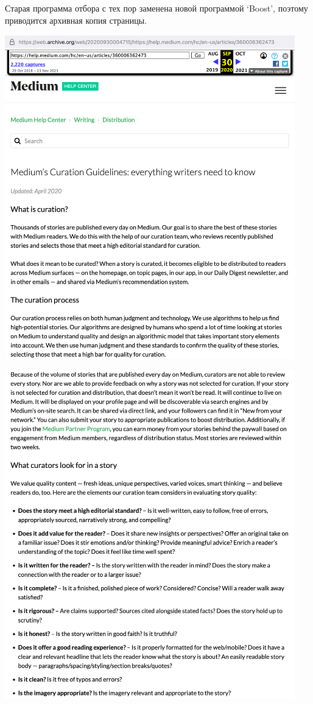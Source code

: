 
Старая программа отбора с тех пор заменена новой программой `Boost',
поэтому приводится архивная копия страницы.

\begin{center}
    \includegraphics[width=34em]{medium-help-curation-p1}
\end{center}
\WillContinue
\pagebreak

\Continuing
\begin{center}
    \includegraphics[width=34em]{medium-help-curation-p2}
\end{center}

\pagebreak
